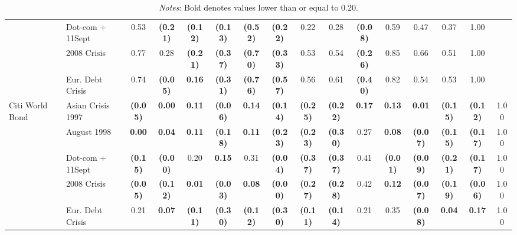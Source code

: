 \documentclass[12pt]{article}
\begin{document}
\begin{table}[H]
{\begin{tabular}{@{}llcccccccccccccc@{}}
                  & Dot-com + 11Sept  & 0.53            & \textbf{(0.21)} & \textbf{(0.12)} & \textbf{(0.13)} & \textbf{(0.52)} & \textbf{(0.22)} & 0.22            & 0.28            & \textbf{(0.08)} & 0.59            & 0.47            & 0.37            & 1.00            &                 \\
                  & 2008 Crisis       & 0.77            & 0.28            & \textbf{(0.21)} & \textbf{(0.37)} & \textbf{(0.70)} & \textbf{(0.33)} & 0.53            & 0.54            & \textbf{(0.26)} & 0.85            & 0.66            & 0.51            & 1.00            &                 \\
                  & Eur. Debt Crisis  & 0.74            & \textbf{(0.05)} & \textbf{0.16}   & \textbf{(0.31)} & \textbf{(0.76)} & \textbf{(0.57)} & 0.56            & 0.61            & \textbf{(0.40)} & 0.82            & 0.54            & 0.53            & 1.00            &                 \\
Citi World Bond   & Asian Crisis 1997 & \textbf{(0.05)} & \textbf{0.00}   & \textbf{0.11}   & \textbf{(0.06)} & \textbf{0.14}   & \textbf{(0.14)} & \textbf{(0.25)} & \textbf{(0.22)} & \textbf{0.17}   & \textbf{0.13}   & \textbf{0.01}   & \textbf{(0.15)} & \textbf{(0.12)} & 1.00            \\
                  & August 1998       & \textbf{0.00}   & \textbf{0.04}   & \textbf{0.11}   & \textbf{(0.18)} & \textbf{0.11}   & \textbf{(0.23)} & \textbf{(0.23)} & \textbf{(0.30)} & 0.27            & \textbf{0.08}   & \textbf{(0.07)} & \textbf{(0.15)} & \textbf{(0.17)} & 1.00            \\
                  & Dot-com + 11Sept  & \textbf{(0.15)} & \textbf{(0.00)} & 0.20            & \textbf{0.15}   & 0.31            & \textbf{(0.04)} & \textbf{(0.37)} & \textbf{(0.37)} & 0.41            & \textbf{(0.01)} & \textbf{(0.09)} & \textbf{(0.21)} & \textbf{(0.17)} & 1.00            \\
                  & 2008 Crisis       & \textbf{(0.05)} & \textbf{(0.12)} & \textbf{0.01}   & \textbf{(0.03)} & \textbf{0.08}   & \textbf{(0.00)} & \textbf{(0.27)} & \textbf{(0.28)} & 0.42            & \textbf{0.12}   & \textbf{(0.07)} & \textbf{(0.19)} & \textbf{(0.06)} & 1.00            \\
                  & Eur. Debt Crisis  & 0.21            & \textbf{0.07}   & \textbf{(0.11)} & \textbf{(0.30)} & \textbf{(0.12)} & \textbf{(0.30)} & \textbf{(0.11)} & \textbf{(0.14)} & 0.21            & 0.35            & \textbf{(0.08)} & \textbf{0.04}   & \textbf{0.17}   & 1.00            \\ \bottomrule
\end{tabular}}
\medskip
\caption*{\textit{Notes}: Bold denotes values lower than or equal to 0.20.}
\end{table}
\end{document}
